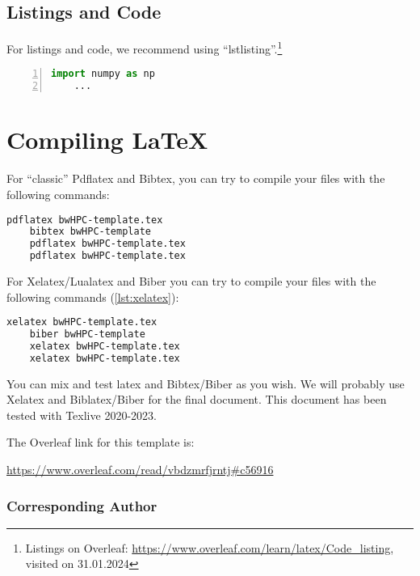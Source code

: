 \documentclass[
  paper       = a4,
  headheight  = 16pt,
  footheight  = 16pt,
  fontsize    = 10pt,
  twoside     = true,
  titlepage   = true,
]{scrartcl}
\begin{document}
\subsection{Listings and Code}

For listings and code, we recommend using \enquote{lstlisting}.\footnote{Listings on Overleaf: \url{https://www.overleaf.com/learn/latex/Code_listing}, visited on 31.01.2024}
\begin{lstlisting}[language=Python, caption=Implementation of ..., label=lst:numpy, numbers=left]
    import numpy as np
    ...
\end{lstlisting}


\section{Compiling \LaTeX}

For \enquote{classic} Pdflatex and Bibtex, you can try to compile your files with the following commands:
\begin{lstlisting}[language=sh, caption=Build Document with Pdflatex and Bibtex, label=lst:pdflatex]
    pdflatex bwHPC-template.tex
    bibtex bwHPC-template
    pdflatex bwHPC-template.tex
    pdflatex bwHPC-template.tex
\end{lstlisting}

For Xelatex/Lualatex and Biber you can try to compile your files with the following commands (\autoref{lst:xelatex}):
\begin{lstlisting}[language=sh, caption=Build Document with Xelatex and Biber, label=lst:xelatex]
    xelatex bwHPC-template.tex
    biber bwHPC-template
    xelatex bwHPC-template.tex
    xelatex bwHPC-template.tex
\end{lstlisting}

You can mix and test \*latex and Bibtex/Biber as you wish.
We will probably use Xelatex and Biblatex/Biber for the final document.
This document has been tested with Texlive 2020-2023.

The Overleaf link for this template is:

\url{https://www.overleaf.com/read/vbdzmrfjrntj#c56916}



\subsubsection*{Corresponding Author}
\label{sec:cauthor}
\end{document}
